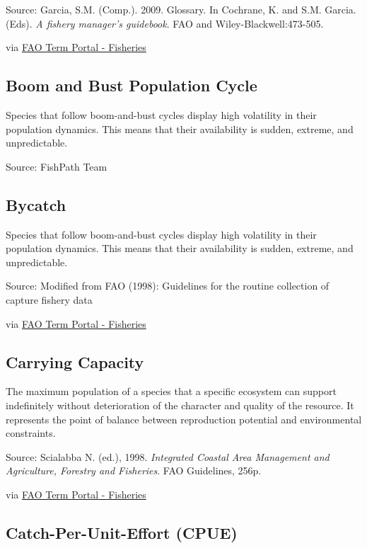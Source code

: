 \documentclass[
  11pt,
]{book}
\begin{document}
Source: Garcia, S.M. (Comp.). 2009. Glossary. In Cochrane, K. and S.M. Garcia. (Eds). \emph{A fishery manager's guidebook}. FAO and Wiley-Blackwell:473-505.

via \href{http://www.fao.org/fishery/glossary/en}{FAO Term Portal - Fisheries}

\hypertarget{boom-and-bust-population-cycle}{%
\subsection{Boom and Bust Population Cycle}\label{boom-and-bust-population-cycle}}

Species that follow boom-and-bust cycles display high volatility in their population dynamics. This means that their availability is sudden, extreme, and unpredictable.

Source: FishPath Team

\hypertarget{bycatch}{%
\subsection{Bycatch}\label{bycatch}}

Species that follow boom-and-bust cycles display high volatility in their population dynamics. This means that their availability is sudden, extreme, and unpredictable.

Source: Modified from FAO (1998): Guidelines for the routine collection of capture fishery data

via \href{http://www.fao.org/fishery/glossary/en}{FAO Term Portal - Fisheries}

\hypertarget{carrying-capacity}{%
\subsection{Carrying Capacity}\label{carrying-capacity}}

The maximum population of a species that a specific ecosystem can support indefinitely without deterioration of the character and quality of the resource. It represents the point of balance between reproduction potential and environmental constraints.

Source: Scialabba N. (ed.), 1998. \emph{Integrated Coastal Area Management and Agriculture, Forestry and Fisheries}. FAO Guidelines, 256p.

via \href{http://www.fao.org/fishery/glossary/en}{FAO Term Portal - Fisheries}

\hypertarget{catch-per-unit-effort-cpue}{%
\subsection{Catch-Per-Unit-Effort (CPUE)}\label{catch-per-unit-effort-cpue}}
\end{document}
